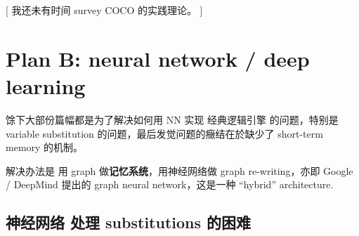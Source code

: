 \documentclass[12pt, orivec]{article}
\begin{document}
[ 我还未有时间 survey COCO 的实践理论。 ]

\section{Plan B: neural network / deep learning}

馀下大部份篇幅都是为了解决如何用 NN 实现 经典逻辑引擎 的问题，特别是 variable substitution 的问题，最后发觉问题的癥结在於缺少了 short-term memory 的机制。

解决办法是 用 graph 做\textbf{记忆系统}，用神经网络做 graph re-writing，亦即 Google / DeepMind 提出的 graph neural network，这是一种 ``hybrid'' architecture.

\subsection{神经网络 处理 substitutions 的困难}
\label{NN}
\end{document}
